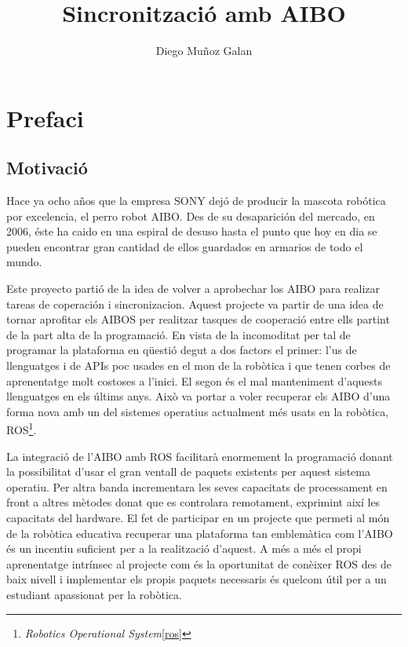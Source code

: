 \documentclass[12pt,a4paper,final,twoside]{article}
\title{Sincronització amb AIBO}
\author{Diego Muñoz Galan}
\begin{document}
\maketitle
\thispagestyle{empty}

\newpage
\paragraph{}
\thispagestyle{empty}
\cleardoublepage

\setcounter{page}{1}

\begin{abstract}

\end{abstract}

\newpage
\cleardoublepage

\tableofcontents
\newpage
\listoffigures
\newpage
\listoftables
\newpage


\section{Prefaci}
\subsection{Motivació}
Hace ya ocho años que la empresa SONY dejó de producir la mascota robótica por excelencia, el perro robot AIBO. Des de su desaparición del mercado, en 2006, éste ha caido en una espiral de desuso hasta el punto que hoy en dia se pueden encontrar gran cantidad de ellos guardados en armarios de todo el mundo.

Este proyecto partió de la idea de volver a aprobechar los AIBO para realizar tareas de coperación i sincronizacion.
Aquest projecte va partir de una idea de tornar aprofitar els AIBOS per realitzar tasques de cooperació entre ells partint de la part alta de la programació. En vista de la incomoditat per tal de programar la plataforma en qüestió degut a dos factors el primer: l'us de llenguatges i de APIs poc usades en el mon de la robòtica i que tenen corbes de aprenentatge molt costoses a l'inici. El segon és el mal manteniment d'aquests llenguatges en els últims anys.
Això va portar a voler recuperar els AIBO d'una forma nova amb un del sistemes operatius actualment més usats en la robòtica, ROS\footnote{\textit{Robotics Operational System}\ref{ros}}. 

La integració de l'AIBO amb ROS facilitarà enormement la programació donant la possibilitat d'usar el gran ventall de paquets existents per aquest sistema operatiu. Per altra banda incrementara les seves capacitats de processament en front a altres mètodes donat que es controlara remotament, exprimint així les capacitats del hardware.
El fet de participar en un projecte que permeti al món de la robòtica educativa recuperar una plataforma tan emblemàtica com l'AIBO és un incentiu suficient per a la realització d'aquest. A més a més el propi aprenentatge intrínsec al projecte com és la oportunitat de conèixer ROS des de baix nivell i implementar els propis paquets necessaris és quelcom útil per a un estudiant apassionat per la robòtica. 
\end{document}

